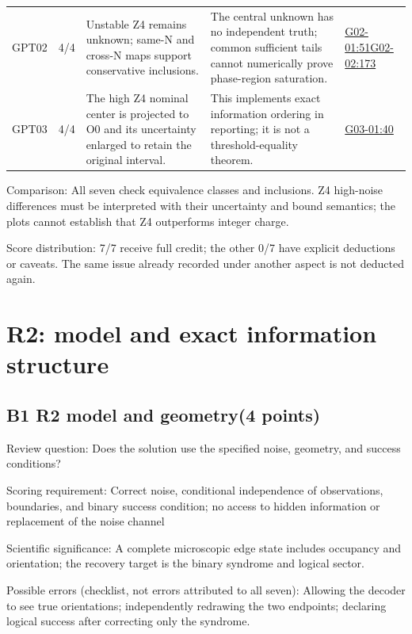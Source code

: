 \documentclass[11pt,a4paper]{article}
\begin{document}
{\begin{longtable}
{}GPT02 & 4/\allowbreak{}4 & Unstable Z4 remains unknown; same-N and cross-N maps support conservative inclusions. & The central unknown has no independent truth; common sufficient tails cannot numerically prove phase-region saturation. & \hyperref[src:G02-01]{G02-01:51}\newline \hyperref[src:G02-02]{G02-02:173}\tabularnewline
{}GPT03 & 4/\allowbreak{}4 & The high Z4 nominal center is projected to O0 and its uncertainty enlarged to retain the original interval. & This implements exact information ordering in reporting; it is not a threshold-equality theorem. & \hyperref[src:G03-01]{G03-01:40}\tabularnewline
\bottomrule
\end{longtable}
}
Comparison: All seven check equivalence classes and inclusions. Z4 high-noise differences must be interpreted with their uncertainty and bound semantics; the plots cannot establish that Z4 outperforms integer charge.

Score distribution: 7/\allowbreak{}7 receive full credit; the other 0/\allowbreak{}7 have explicit deductions or caveats. The same issue already recorded under another aspect is not deducted again.

\clearpage
\section{R2: model and exact information structure}
\subsection{B1 R2 model and geometry(4 points)}
\label{aspect:B1}
Review question: Does the solution use the specified noise,\allowbreak{} geometry,\allowbreak{} and success conditions?

Scoring requirement: Correct noise,\allowbreak{} conditional independence of observations,\allowbreak{} boundaries,\allowbreak{} and binary success condition; no access to hidden information or replacement of the noise channel

Scientific significance: A complete microscopic edge state includes occupancy and orientation; the recovery target is the binary syndrome and logical sector.

Possible errors (checklist,\allowbreak{} not errors attributed to all seven): Allowing the decoder to see true orientations; independently redrawing the two endpoints; declaring logical success after correcting only the syndrome.
\end{document}
